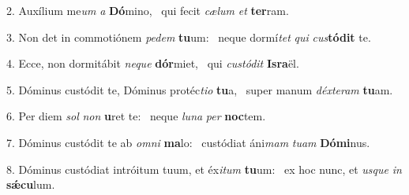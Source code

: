 2. Auxílium me\textit{um} \textit{a} \textbf{Dó}mino, \ast\  qui fecit \textit{cæ}\textit{lum} \textit{et} \textbf{ter}ram.\

3. Non det in commotiónem \textit{pe}\textit{dem} \textbf{tu}um: \ast\  neque dormí\textit{tet} \textit{qui} \textit{cus}\textbf{tó}\textbf{dit} te.\

4. Ecce, non dormitábit \textit{ne}\textit{que} \textbf{dór}miet, \ast\  qui \textit{cus}\textit{tó}\textit{dit} \textbf{Is}\textbf{ra}ël.\

5. Dóminus custódit te, Dóminus protéc\textit{ti}\textit{o} \textbf{tu}a, \ast\  super manum \textit{déx}\textit{te}\textit{ram} \textbf{tu}am.\

6. Per diem \textit{sol} \textit{non} \textbf{u}ret te: \ast\  neque \textit{lu}\textit{na} \textit{per} \textbf{noc}tem.\

7. Dóminus custódit te ab \textit{om}\textit{ni} \textbf{ma}lo: \ast\  custódiat áni\textit{mam} \textit{tu}\textit{am} \textbf{Dó}\textbf{mi}nus.\

8. Dóminus custódiat intróitum tuum, et éx\textit{i}\textit{tum} \textbf{tu}um: \ast\  ex hoc nunc, et \textit{us}\textit{que} \textit{in} \textbf{sǽ}\textbf{cu}lum.\


